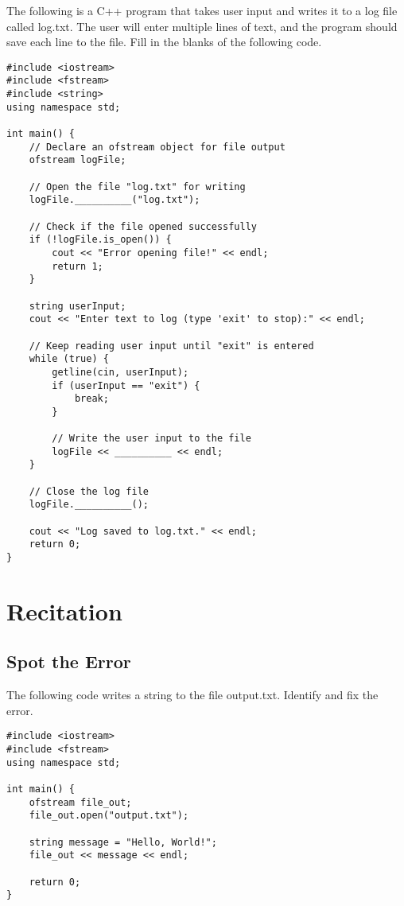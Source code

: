 \begin{problem}
The following is a C++ program that takes user input and writes it to a log file called log.txt. The user will enter multiple lines of text, and the program should save each line to the file. Fill in the blanks of the following code.

\begin{verbatim}
#include <iostream>
#include <fstream>
#include <string>
using namespace std;

int main() {
    // Declare an ofstream object for file output
    ofstream logFile;

    // Open the file "log.txt" for writing
    logFile.__________("log.txt");

    // Check if the file opened successfully
    if (!logFile.is_open()) {
        cout << "Error opening file!" << endl;
        return 1;
    }

    string userInput;
    cout << "Enter text to log (type 'exit' to stop):" << endl;

    // Keep reading user input until "exit" is entered
    while (true) {
        getline(cin, userInput);
        if (userInput == "exit") {
            break;
        }

        // Write the user input to the file
        logFile << __________ << endl;
    }

    // Close the log file
    logFile.__________();

    cout << "Log saved to log.txt." << endl;
    return 0;
}
\end{verbatim}
\end{problem}
\newpage

\section{Recitation}
\subsection{Spot the Error}
\begin{multipart}
The following code writes a string to the file output.txt. Identify and fix the error.
\end{multipart}

\begin{verbatim}
#include <iostream>
#include <fstream>
using namespace std;

int main() {
    ofstream file_out;
    file_out.open("output.txt");

    string message = "Hello, World!";
    file_out << message << endl;

    return 0;
}

\end{verbatim}


